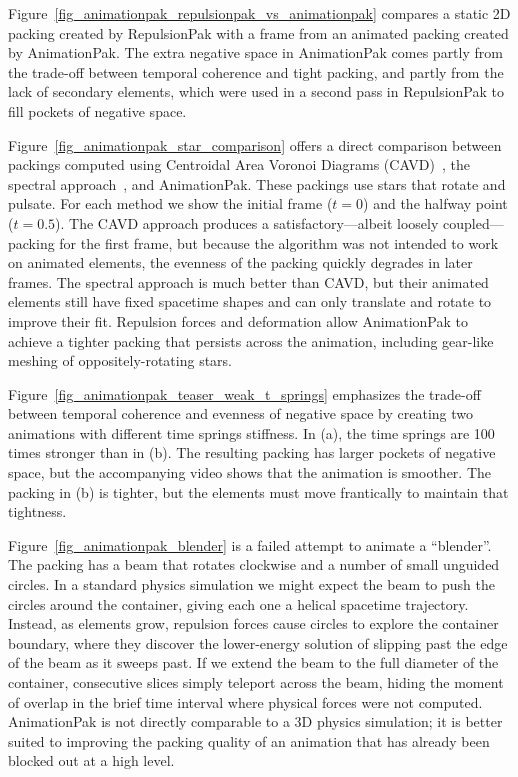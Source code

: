 Figure~\ref{fig_animationpak_repulsionpak_vs_animationpak} compares
a static 2D packing created by RepulsionPak with a frame
from an animated packing created by AnimationPak.
The extra negative space in AnimationPak comes partly from the trade-off
between temporal coherence and tight packing, and partly from the lack
of secondary elements, which were used in a second pass in RepulsionPak 
to fill pockets of negative space.


Figure~\ref{fig_animationpak_star_comparison} offers a direct comparison between
packings computed using Centroidal Area Voronoi Diagrams
(CAVD)~\cite{Smith2005}, the spectral approach~\cite{Dalal2006}, and AnimationPak.
These packings use stars that rotate and pulsate.
For each method we show the initial frame ($t=0$) and the halfway point
($t=0.5$).  The CAVD approach produces a satisfactory---albeit
loosely coupled---packing for the first frame, but because the 
algorithm was not intended to work on animated elements, 
the evenness of the packing quickly degrades in later frames.
The spectral approach is much better
than CAVD, but their animated elements still have fixed spacetime shapes
and can only translate and rotate to improve their fit. 
Repulsion forces and deformation allow AnimationPak to achieve a tighter packing
that persists across the animation, including gear-like meshing of
oppositely-rotating stars.




Figure~\ref{fig_animationpak_teaser_weak_t_springs} emphasizes the trade-off between
temporal coherence and evenness of negative space by creating two animations
with different time springs stiffness.  In (a), the time springs
are 100 times stronger than in (b).  The resulting packing has larger
pockets of negative space, but the accompanying video shows that the
animation is smoother.  The packing in (b) is tighter, but the elements
must move frantically to maintain that tightness.


Figure~\ref{fig_animationpak_blender} is a failed attempt to animate a ``blender''.
The packing has a beam that rotates clockwise
and a number of small unguided circles.  
In a standard physics simulation we might expect the beam to push the 
circles around the container, giving each one a helical spacetime 
trajectory.
Instead, as elements grow, repulsion forces cause circles to explore the 
container boundary, where they discover the lower-energy solution of 
slipping past the edge of the beam as it sweeps past.
If we extend the beam to the full diameter of the container,
consecutive slices simply teleport across the beam, hiding the moment of
overlap in the brief time interval where physical forces were not computed.
AnimationPak is not directly comparable to a
3D physics simulation; it is better suited to improving the
packing quality of an animation that has already been blocked out at a 
high level.


